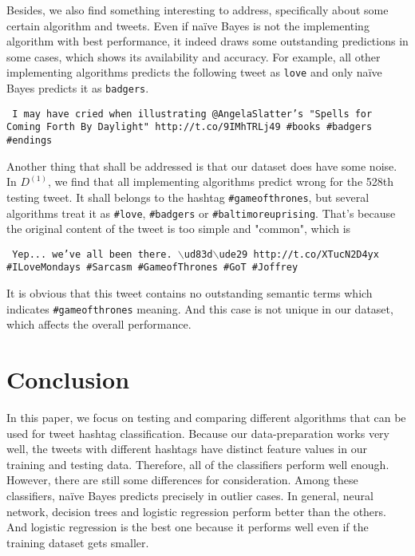 \documentclass[letterpaper,11pt,twocolumn]{article}
\begin{document}
Besides, we also find something interesting to address, specifically about some certain algorithm and tweets. Even if na{\"i}ve Bayes is not the implementing algorithm with best performance, it indeed draws some outstanding predictions in some cases, which shows its availability and accuracy. For example, all other implementing algorithms predicts the following tweet as \texttt{love} and only na{\"i}ve Bayes predicts it as \texttt{badgers}.
\begin{framed}
\texttt{
I may have cried when illustrating @AngelaSlatter's "Spells for Coming Forth By Daylight" http://t.co/9IMhTRLj49 \#books \#badgers \#endings
}
\end{framed}
Another thing that shall be addressed is that our dataset does have some noise. In $D^{(1)}$, we find that all implementing algorithms predict wrong for the 528th testing tweet. It shall belongs to the hashtag \texttt{\#gameofthrones}, but several algorithms treat it as \texttt{\#love}, \texttt{\#badgers} or \texttt{\#baltimoreuprising}. That's because the original content of the tweet is too simple and "common", which is
\begin{framed}
\texttt{
Yep... we've all been there. $\backslash$ud83d$\backslash$ude29 http://t.co/XTucN2D4yx  \#ILoveMondays \#Sarcasm \#GameofThrones \#GoT \#Joffrey
}
\end{framed}
It is obvious that this tweet contains no outstanding semantic terms which indicates \texttt{\#gameofthrones} meaning. And this case is not unique in our dataset, which affects the overall performance.



\section{Conclusion}
\label{sec:conc}
In this paper, we focus on testing and comparing different algorithms that can be used for tweet hashtag classification. Because our data-preparation works very well, the tweets with different hashtags have distinct feature values in our training and testing data. Therefore, all of the classifiers perform well enough. However, there are still some differences for consideration. Among these classifiers, na{\"i}ve Bayes predicts precisely in outlier cases. In general, neural network, decision trees and logistic regression perform better than the others. And logistic regression is the best one because it performs well even if the training dataset gets smaller.

% 


\end{document}
